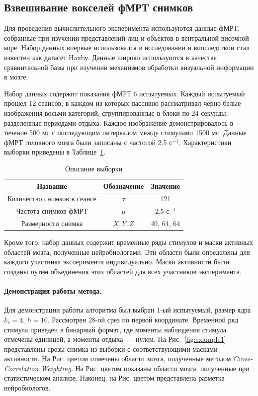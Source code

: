 \subsection{Взвешивание вокселей фМРТ снимков}
Для проведения вычислительного эксперимента используются данные фМРТ, собранные при изучении представлений лиц и объектов в вентральной височной коре. Набор данных впервые использовался в исследовании \cite{haxby2001distributed} и впоследствии стал известен как датасет Haxby. Данные широко используются в качестве сравнительной базы при изучении механизмов обработки визуальной информации в мозге.

Набор данных содержит показания фМРТ 6 испытуемых. Каждый испытуемый прошел 12 сеансов, в каждом из которых пассивно рассматривал черно-белые изображения восьми категорий, сгруппированные в блоки по 24 секунды, разделенные периодами отдыха. Каждое изображение демонстрировалось в течение 500 мс с последующим интервалом между стимулами 1500 мс. Данные фМРТ головного мозга были записаны с частотой 2.5 $\text{с}^{-1}$. Характеристики выборки приведены в Таблице~\ref{table:sample_2}.

\begin{table}[h!]
	\centering
	\caption{Описание выборки}
	\begin{tabular}{|c|c|c|}
		\hline
		Название                       & Обозначение & Значение             \\
		\hline \hline
		Количество снимков в сеансе & $\tau$ & 121 \\ \hline
		Частота снимков фМРТ           & $\mu$       & 2.5 $\text{с}^{-1}$ \\ \hline
		Размерности снимка             & $X, Y, Z$   & 40, 64, 64           \\ \hline
	\end{tabular}
	\label{table:sample_2}
\end{table}
Кроме того, набор данных содержит временные ряды стимулов и маски активных областей мозга, полученные нейробиологами. Эти области были определены для каждого участника эксперимента индивидуально. Маски активности были созданы путем объединения этих областей для всех участников эксперимента. 

\paragraph*{Демонстрация работы метода.}
Для демонстрации работы алгоритма был выбран 1-ый испытуемый, размер ядра $k_s = 4$, $h=10$. Рассмотрен 28-ой срез по первой координате.
Временной ряд стимула приведен в бинарный формат, где моменты наблюдения стимула отмечены единицей, а моменты отдыха~--- нулем.
На Рис.~\ref{fig:example1} представлены срезы снимка из выборки с соответствующими масками активности. На Рис. цветом отмечены области мозга, полученные методом \textit{Cross-Correlation Weighting}. На Рис. цветом показаны области мозга, полученные при статистическом анализе. Наконец, на Рис. цветом представлена разметка нейробиологов.

